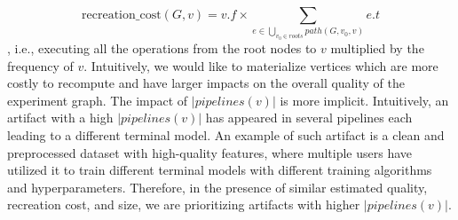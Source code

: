 \[
\text{recreation\_cost}(G,v) = v.f \times \sum\limits_{e \in \bigcup\limits_{v_{0}\in roots} path(G, v_{0}, v)} e.t\]
, i.e., executing all the operations from the root nodes to $v$ multiplied by the frequency of $v$.
Intuitively, we would like to materialize vertices which are more costly to recompute and have larger impacts on the overall quality of the experiment graph.
The impact of $|pipelines(v)|$ is more implicit.
Intuitively, an artifact with a high $|pipelines(v)|$ has appeared in several pipelines each leading to a different terminal model.
An example of such artifact is a clean and preprocessed dataset with high-quality features, where multiple users have utilized it to train different terminal models with different training algorithms and hyperparameters.
Therefore, in the presence of similar estimated quality, recreation cost, and size, we are prioritizing artifacts with higher $|pipelines(v)|$.

%
%
